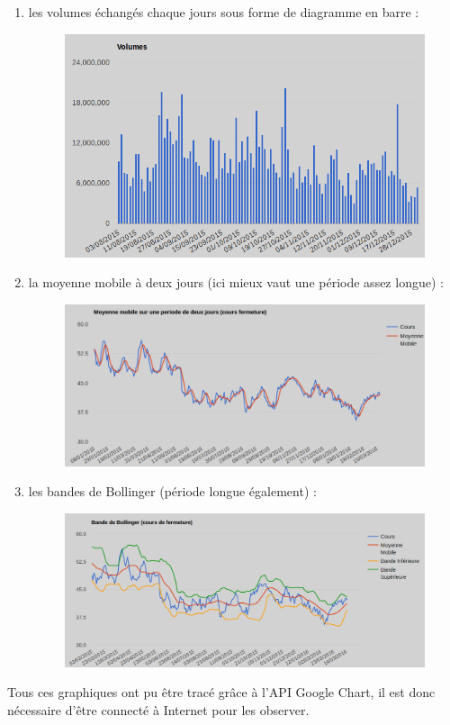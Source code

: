 \begin{enumerate}
\begin{enumerate}
\begin{figure}[H]
	  \end{figure}
	\item les volumes échangés chaque jours sous forme de diagramme en barre :\\
	  \begin{figure}[H]
	    \center
	    \includegraphics[scale=0.5]{../graph/6-historiquevolumes.png}
	  \end{figure}
	\item la moyenne mobile à deux jours (ici mieux vaut une période assez longue) :\\
	  \begin{figure}[H]
	    \center
	    \includegraphics[scale=0.5]{../graph/6-historiqueMoyMob.png}
	  \end{figure}
	\item les bandes de Bollinger (période longue également) :\\
	  \begin{figure}[H]
	    \center
	    \includegraphics[scale=0.5]{../graph/6-historiqueBollinger.png} 
	  \end{figure}
      \end{enumerate}
      Tous ces graphiques ont pu être tracé grâce à l'API Google Chart, il est donc nécessaire d'être connecté à Internet pour les observer.
      

\end{enumerate}
